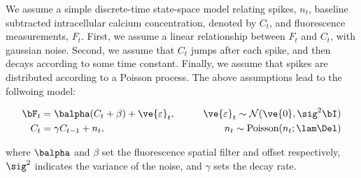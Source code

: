 We assume a simple discrete-time state-space model relating spikes, $n_t$, baseline subtracted intracellular calcium concentration, denoted by $C_t$, and fluorescence measurements, $F_t$.  First, we assume a linear relationship between $F_t$ and $C_t$, with gaussian noise.  Second, we assume that $C_t$ jumps after each spike, and then decays according to some time constant.  Finally, we assume that spikes are distributed according to a Poisson process. The above assumptions lead to the follwoing model:


\begin{align}
\bF_t &= \balpha (C_t + \beta) +  \ve{\varepsilon}_t, \qquad &\ve{\varepsilon}_t \sim \mathcal{N}(\ve{0},\sig^2 \bI) \label{eq:obs} \\
C_t  &= \gamma  C_{t-1} + n_t,  \qquad &n_t \sim \text{Poisson}(n_t; \lam \Del) \label{eq:trans}  
\end{align}

\noindent where $\balpha$ and $\beta$ set the fluorescence spatial filter and offset respectively, $\sig^2$ indicates the variance of the noise, and $\gamma$ sets the decay rate. %


